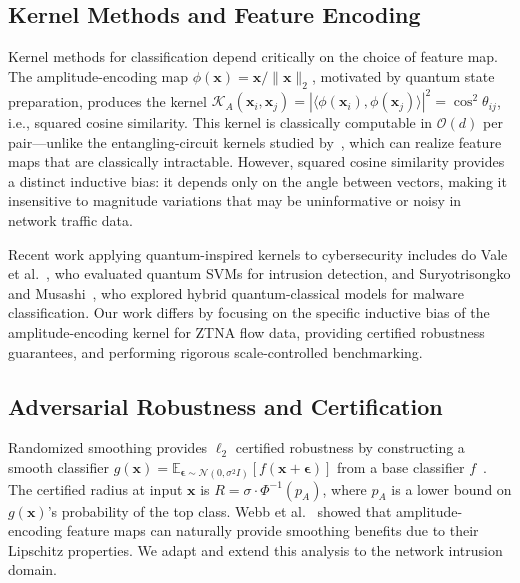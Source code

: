 \documentclass[twocolumn,a4paper,11pt]{article}
\begin{document}
\subsection{Kernel Methods and Feature Encoding}

Kernel methods for classification depend critically on the choice of feature map.
The amplitude-encoding map $\phi(\mathbf{x}) = \mathbf{x} / \|\mathbf{x}\|_2$,
motivated by quantum state preparation, produces the kernel
$\mathcal{K}_A(\mathbf{x}_i, \mathbf{x}_j) = |\langle\phi(\mathbf{x}_i),
\phi(\mathbf{x}_j)\rangle|^2 = \cos^2\theta_{ij}$, i.e., squared cosine similarity.
This kernel is classically computable in $\mathcal{O}(d)$ per pair---unlike the
entangling-circuit kernels studied
by~\cite{havlicek2019supervised,huang2021power}, which can realize feature maps
that are classically intractable. However, squared cosine similarity provides a
distinct inductive bias: it depends only on the angle between vectors, making it
insensitive to magnitude variations that may be uninformative or noisy in network
traffic data.

Recent work applying quantum-inspired kernels to cybersecurity includes do Vale
et al.~\cite{vale2023quantum}, who evaluated quantum SVMs for intrusion detection,
and Suryotrisongko and Musashi~\cite{suryotrisongko2022quantum}, who explored
hybrid quantum-classical models for malware classification. Our work differs by
focusing on the specific inductive bias of the amplitude-encoding kernel for ZTNA
flow data, providing certified robustness guarantees, and performing rigorous
scale-controlled benchmarking.

\subsection{Adversarial Robustness and Certification}

Randomized smoothing provides $\ell_2$ certified robustness by constructing a
smooth classifier $g(\mathbf{x}) = \mathbb{E}_{\boldsymbol{\epsilon} \sim \mathcal{N}(0,\sigma^2 I)}[f(\mathbf{x} + \boldsymbol{\epsilon})]$
from a base classifier $f$~\cite{cohen2019certified}. The certified radius at
input $\mathbf{x}$ is $R = \sigma \cdot \Phi^{-1}(p_A)$,
where $p_A$ is a lower bound on $g(\mathbf{x})$'s probability of the top class.
Webb et al.~\cite{webb2023quantum} showed that amplitude-encoding feature maps can naturally
provide smoothing benefits due to their Lipschitz properties. We adapt and extend
this analysis to the network intrusion domain.
\end{document}
